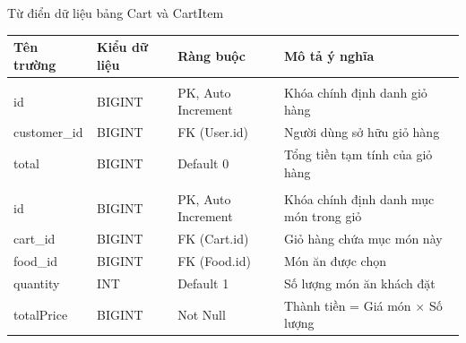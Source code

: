 \documentclass{uetgraduation}
\begin{document}
\begin{table}[!htbp]{Từ điển dữ liệu bảng Cart và CartItem}
\centering
\small
\begin{tabularx}{\textwidth}{|>{\raggedright\arraybackslash}p{2.8cm}|>{\raggedright\arraybackslash}p{3.0cm}|>{\raggedright\arraybackslash}p{3.5cm}|>{\raggedright\arraybackslash}X|}
\hline
\textbf{Tên trường} & \textbf{Kiểu dữ liệu} & \textbf{Ràng buộc} & \textbf{Mô tả ý nghĩa} \\ \hline
\multicolumn{4}{|c|}{\textbf{Bảng Cart}} \\ \hline
id & BIGINT & PK, Auto Increment & Khóa chính định danh giỏ hàng \\ \hline
customer\_id & BIGINT & FK (User.id) & Người dùng sở hữu giỏ hàng \\ \hline
total & BIGINT & Default 0 & Tổng tiền tạm tính của giỏ hàng \\ \hline
\multicolumn{4}{|c|}{\textbf{Bảng CartItem}} \\ \hline
id & BIGINT & PK, Auto Increment & Khóa chính định danh mục món trong giỏ \\ \hline
cart\_id & BIGINT & FK (Cart.id) & Giỏ hàng chứa mục món này \\ \hline
food\_id & BIGINT & FK (Food.id) & Món ăn được chọn \\ \hline
quantity & INT & Default 1 & Số lượng món ăn khách đặt \\ \hline
totalPrice & BIGINT & Not Null & Thành tiền = Giá món $\times$ Số lượng \\ \hline
\end{tabularx}
\end{table}
\clearpage
\end{document}

